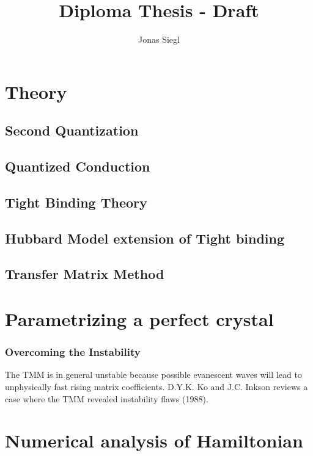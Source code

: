 
\author{Jonas Siegl}
\title{Diploma Thesis - Draft}




\maketitle

\thispagestyle{plain}


\tableofcontents
\clearpage
\section{Theory}
\subsection{Second Quantization}
\subsection{Quantized Conduction}
\subsection{Tight Binding Theory}
\subsection{Hubbard Model extension of Tight binding}
\subsection{Transfer Matrix Method}

\section{Parametrizing a perfect crystal}
\subsubsection{Overcoming the Instability}
The TMM is in general unstable because possible evanescent waves will lead to unphysically fast rising matrix coefficients.
D.Y.K. Ko and J.C. Inkson reviews a case where the TMM revealed instability flaws (1988).
\section{Numerical analysis of Hamiltonian}

